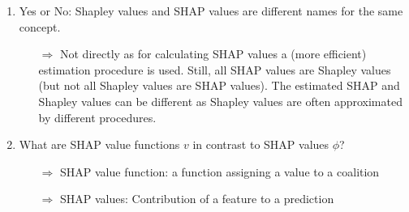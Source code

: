 \begin{enumerate}
\begin{itemize}
	\end{itemize}
    \item Yes or No: Shapley values and SHAP values are different names for the same concept.
    \begin{itemize}
    	\item[$\Rightarrow$] Not directly as for calculating SHAP values a (more efficient) estimation procedure is used. Still, all SHAP values are Shapley values (but not all Shapley values are SHAP values). The estimated SHAP and Shapley values can be different as Shapley values are often approximated by different procedures.
    \end{itemize}
    \item What are SHAP value functions $v$ in contrast to SHAP values $\phi$?
    \begin{itemize}
    	\item[$\Rightarrow$] SHAP value function: a function assigning a value to a coalition
    	\item[$\Rightarrow$] SHAP values: Contribution of a feature to a prediction
    \end{itemize}
\end{enumerate}
